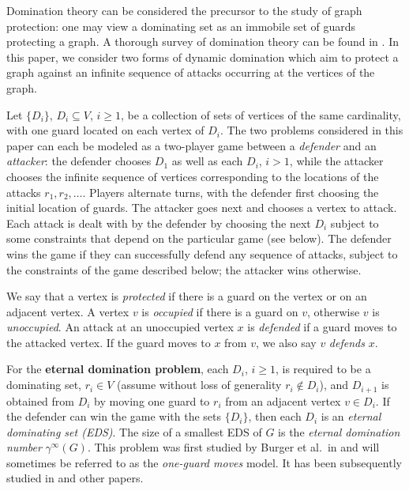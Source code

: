 \documentclass[12pt]{article}%
\begin{document}
Domination theory can be considered the precursor to the study of graph
protection: one may view a dominating set as an immobile set of guards
protecting a graph. A thorough survey of domination theory can be found in
\cite{HHS}. In this paper, we consider two forms of dynamic domination which
aim to protect a graph against an infinite sequence of attacks occurring at
the vertices of the graph.

Let $\{D_{i}\}$, $D_{i}\subseteq V$, $i\geq1$, be a collection of sets of
vertices of the same cardinality, with one guard located on each vertex of
$D_{i}$. The two problems considered in this paper can each be modeled as a
two-player game between a \emph{defender} and an \emph{attacker}: the defender
chooses $D_{1}$ as well as each $D_{i}$, $i>1$, while the attacker chooses the
infinite sequence of vertices corresponding to the locations of the attacks
$r_{1},r_{2},\ldots$. Players alternate turns, with the defender first
choosing the initial location of guards. The attacker goes next and chooses a
vertex to attack. Each attack is dealt with by the defender by choosing the
next $D_{i}$ subject to some constraints that depend on the particular game
(see below). The defender wins the game if they can successfully defend any
sequence of attacks, subject to the constraints of the game described below;
the attacker wins otherwise.

We say that a vertex is \emph{protected} if there is a guard on the vertex or
on an adjacent vertex. A vertex $v$ is \emph{occupied} if there is a guard on
$v$, otherwise $v$ is \emph{unoccupied}. An attack at an unoccupied vertex $x$
is \emph{defended} if a guard moves to the attacked vertex. If the guard moves
to $x$ from $v$, we also say $v$ \emph{defends} $x$.

For the \textbf{eternal domination problem}, each $D_{i}$, $i\geq1$, is
required to be a dominating set, $r_{i}\in V$ (assume without loss of
generality $r_{i}\notin D_{i}$), and $D_{i+1}$ is obtained from $D_{i}$ by
moving one guard to $r_{i}$ from an adjacent vertex $v\in D_{i}$. If the
defender can win the game with the sets $\{D_{i}\}$, then each $D_{i}$ is an
\emph{eternal dominating set (EDS)}. The size of a smallest EDS of $G$ is the
\emph{eternal domination number} $\gamma^{\infty}(G)$. This problem was first
studied by Burger et al.~in \cite{BCG2} and will sometimes be referred to as
the \emph{one-guard moves} model. It has been subsequently studied in
\cite{ABB,GK, KM} and other papers.
\end{document}
